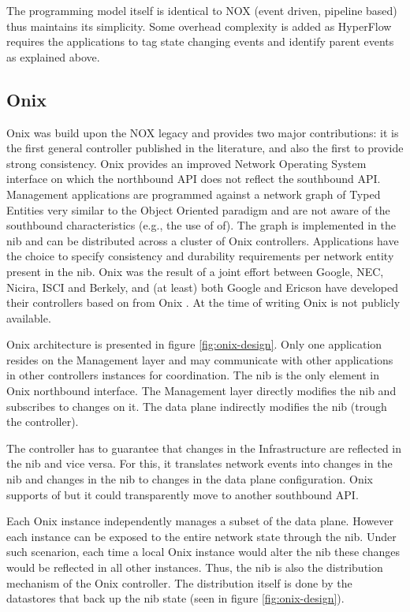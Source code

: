 \begin{itemize}
The programming model itself is identical to NOX  (event driven,
pipeline based) thus
maintains its simplicity. Some overhead complexity is added as
HyperFlow requires the applications to tag  state changing events and
identify parent events as explained above. 

\subsection{Onix}
Onix \cite{Koponen:2010th}  was build upon the NOX legacy and
provides two major contributions: it is the first general controller
published in the literature, and also the first to provide strong consistency.  Onix 
provides an improved Network Operating System interface on 
which the northbound API does not reflect the southbound
API. Management applications are programmed against a network
graph of Typed Entities very similar to the Object Oriented paradigm
and are not aware of the southbound characteristics (e.g., the use of \gls{of}). The graph is implemented in 
the \gls{nib}  and can be distributed across a  cluster of  Onix
controllers. Applications have the choice to specify consistency and
durability requirements  per network entity  present in the \gls{nib}. 
Onix was the result of a joint effort between Google, NEC, Nicira,
ISCI and Berkely, and (at least)  both Google and Ericson have
developed their controllers based on from Onix \cite{The-Valley-of-the-Nerd.:fk}. At the time of
writing Onix is not publicly available. 

Onix architecture is presented in figure \ref{fig:onix-design}. 
Only one application resides on the  Management layer and may
communicate with other applications in other controllers instances for
coordination. 
The \gls{nib} is the only element in Onix northbound interface. 
The Management layer directly modifies the \gls{nib} and subscribes to
changes on it. 
The data plane  indirectly modifies the \gls{nib} (trough the controller). 

The controller  has to guarantee that changes in the Infrastructure are reflected in the \gls{nib} and vice versa. 
For this, it translates network events into changes in the \gls{nib}
and changes in the \gls{nib} to changes in the data plane
configuration. 
Onix supports  \gls{of} but it could transparently move to another southbound API. 

Each Onix instance independently manages a subset of the data plane. 
However each instance can be exposed to the entire network state through  the \gls{nib}.  
Under such scenarion, each time a local Onix instance would alter the \gls{nib} these changes would be reflected in all other instances. 
Thus, the \gls{nib} is also the distribution mechanism of the Onix controller. 
The distribution itself is done by the datastores that back up  the \gls{nib} state (seen in figure \ref{fig:onix-design}).


\end{itemize}
